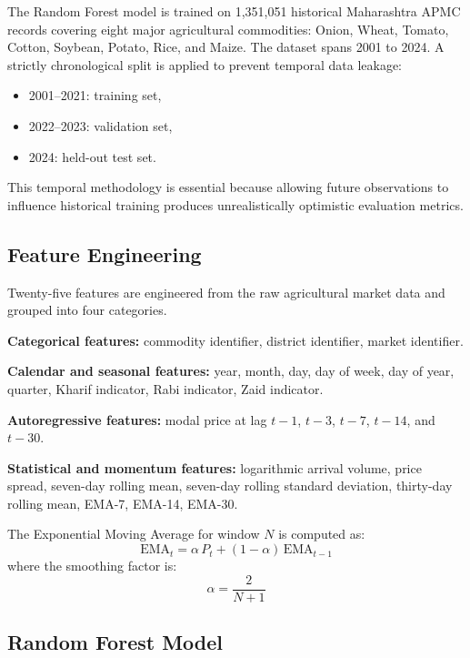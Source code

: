 \documentclass[conference]{IEEEtran}
\begin{document}
The Random Forest model is trained on 1,351,051 historical
Maharashtra APMC records covering eight major agricultural
commodities: Onion, Wheat, Tomato, Cotton, Soybean, Potato, Rice,
and Maize. The dataset spans 2001 to 2024. A strictly chronological
split is applied to prevent temporal data leakage:
\begin{itemize}
    \item 2001--2021: training set,
    \item 2022--2023: validation set,
    \item 2024: held-out test set.
\end{itemize}
This temporal methodology is essential because allowing future
observations to influence historical training produces unrealistically
optimistic evaluation metrics.

\subsection{Feature Engineering}

Twenty-five features are engineered from the raw agricultural market
data and grouped into four categories.

\textbf{Categorical features:} commodity identifier, district
identifier, market identifier.

\textbf{Calendar and seasonal features:} year, month, day, day of
week, day of year, quarter, Kharif indicator, Rabi indicator, Zaid
indicator.

\textbf{Autoregressive features:} modal price at lag $t{-}1$,
$t{-}3$, $t{-}7$, $t{-}14$, and $t{-}30$.

\textbf{Statistical and momentum features:} logarithmic arrival
volume, price spread, seven-day rolling mean, seven-day rolling
standard deviation, thirty-day rolling mean, EMA-7, EMA-14, EMA-30.

The Exponential Moving Average for window $N$ is computed as:
\begin{equation}
    \mathrm{EMA}_t = \alpha\, P_{t} + (1-\alpha)\,\mathrm{EMA}_{t-1}
\end{equation}
where the smoothing factor is:
\begin{equation}
    \alpha = \frac{2}{N+1}
\end{equation}

\subsection{Random Forest Model}
\end{document}
